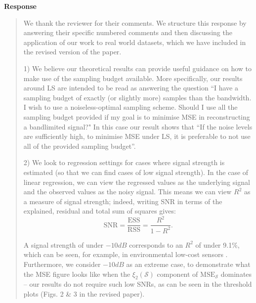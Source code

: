 \documentclass[11pt,onecolumn,journal]{IEEEtran}
\theoremstyle{definition}
\newcommand{\set}[1]{\mathcal{#1}}
\begin{document}
\textbf{Response}
\begin{quote}
We thank the reviewer for their comments. We structure this response by answering their specific numbered comments and then discussing the application of our work to real world datasets, which we have included in the revised version of the paper.

1) We believe our theoretical results can provide useful guidance on how to make use of the sampling budget available. More specifically, our results around LS are intended to be read as answering the question ``I have a sampling budget of exactly (or slightly more) samples than the bandwidth. I wish to use a noiseless-optimal sampling scheme. Should I use all the sampling budget provided if my goal is to minimise MSE in reconstructing a bandlimited signal?"
In this case our result shows that ``If the noise levels are sufficiently high, to minimise MSE under LS, it is preferable to not use all of the provided sampling budget''.



2) We look to regression settings for cases where signal strength is estimated (so that we can find cases of low signal strength). In the case of linear regression, we can view the regressed values as the underlying signal and the observed values as the noisy signal. This means we can view $R^{2}$ as a measure of signal strength; indeed, writing SNR in terms of the explained, residual and total sum of squares gives:
\begin{equation}
    \text{SNR} = \frac{\text{ESS}}{\text{RSS}} = \frac{R^{2}}{1-R^{2}}.
\end{equation}

A signal strength of under $-10dB$ corresponds to an $R^{2}$ of under 9.1\%, which can be seen, for example, in environmental low-cost sensors \cite[Table 4]{bush2023impact}. Furthermore, we consider $-10dB$ as an extreme case, to demonstrate what the MSE figure looks like when the $\xi_{2}(\set{S})$ component of  $\text{MSE}_{\set{S}}$ dominates -- our results do not require such low SNRs, as can be seen in the threshold plots (Figs. 2 \& 3 in the revised paper). %


\end{quote}
\end{document}
